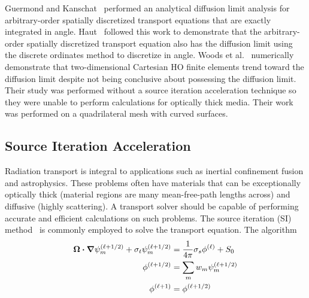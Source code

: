 \documentclass[12pt,letterpaper]{article}
\begin{document}
Guermond and Kanschat~\cite{GuermondDiffLimit} performed an analytical diffusion limit analysis for arbitrary-order spatially discretized transport equations that are exactly integrated in angle. Haut~\cite{Haut2018PersonalComm} followed this work to demonstrate that the arbitrary-order spatially discretized transport equation also has the diffusion limit using the discrete ordinates method to discretize in angle. Woods et al.~\cite{WoodsHoDgfemXyCurved} numerically demonstrate that two-dimensional Cartesian HO finite elements trend toward the diffusion limit despite not being conclusive about possessing the diffusion limit. Their study was performed without a source iteration acceleration technique so they were unable to perform calculations for optically thick media. Their work was performed on a quadrilateral mesh with curved surfaces.


\subsection{Source Iteration Acceleration}
\label{sec:SourceIterationAccelerationIntro}
Radiation transport is integral to applications such as inertial confinement fusion and astrophysics. These problems often have materials that can be exceptionally optically thick (material regions are many mean-free-path lengths across) and diffusive (highly scattering). A transport solver should be capable of performing accurate and efficient calculations on such problems. The source iteration (SI) method~\cite{Lewis_Comp_Methods_Neu_Trans} is commonly employed to solve the transport equation. The algorithm
\begin{subequations}
\begin{flalign}
\bm{\Omega} \bm{\cdot} \bm{\nabla} \psi_m^{(\ell+1/2)} + \sigma_t \psi_m^{(\ell+1/2)} & = \frac{1}{4 \pi} \sigma_s \phi^{(\ell)} + S_0 \label{eq:DSASITransport}\\
\phi^{(\ell+1/2)} & = \sum_m w_m \psi^{(\ell+1/2)}_m \label{eq:DSASIPhiHalf} \\
\phi^{(\ell+1)} & = \phi^{(\ell+1/2)} \label{eq:DSASIUnacceleratedUpdate}
\end{flalign}
\label{eqs:SourceIteration}
\end{subequations}
\end{document}
